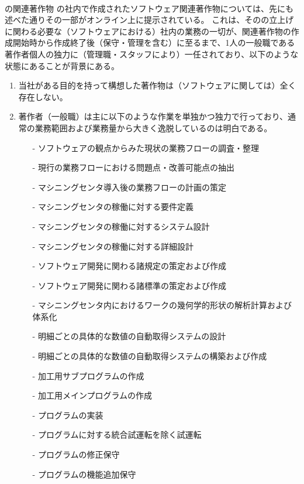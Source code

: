 \clearpage
~\vfill
\begin{Column}{\DMC の関連著作物}
\DMC の社内で作成されたソフトウェア関連著作物については、先にも述べた通りその一部がオンライン上に提示されている。
これは、その\DMC の立上げに関わる必要な（ソフトウェアにおける）社内の業務の一切が、関連著作物の作成開始時から作成終了後（保守・管理を含む）に至るまで、1人の一般職である著作者個人の独力に（管理職・スタッフにより）一任されており、以下のような状態にあることが背景にある。
\tcbline*
\begin{enumerate}[label=\Roman*]
\item 当社がある目的を持って構想した著作物は（ソフトウェアに関しては）全く存在しない。
\item
著作者（一般職）は主に以下のような作業を単独かつ独力で行っており、通常の業務範囲および業務量から大きく逸脱しているのは明白である。
  \begin{enumerate}
  \item[-] ソフトウェアの観点からみた現状の業務フローの調査・整理
  \item[-] 現行の業務フローにおける問題点・改善可能点の抽出
  \item[-] マシニングセンタ導入後の業務フローの計画の策定
  \item[-] マシニングセンタの稼働に対する要件定義
  \item[-] マシニングセンタの稼働に対するシステム設計
  \item[-] マシニングセンタの稼働に対する詳細設計
  \item[-] ソフトウェア開発に関わる諸規定の策定および作成
  \item[-] ソフトウェア開発に関わる諸標準の策定および作成
  \item[-] マシニングセンタ内におけるワークの幾何学的形状の解析計算および体系化
  \item[-] 明細ごとの具体的な数値の自動取得システムの設計
  \item[-] 明細ごとの具体的な数値の自動取得システムの構築および作成
  \item[-] 加工用サブプログラムの作成
  \item[-] 加工用メインプログラムの作成
  \item[-] プログラムの実装
  \item[-] プログラムに対する統合試運転を除く試運転
  \item[-] プログラムの修正保守
  \item[-] プログラムの機能追加保守

\end{enumerate}
\end{enumerate}
\end{Column}
